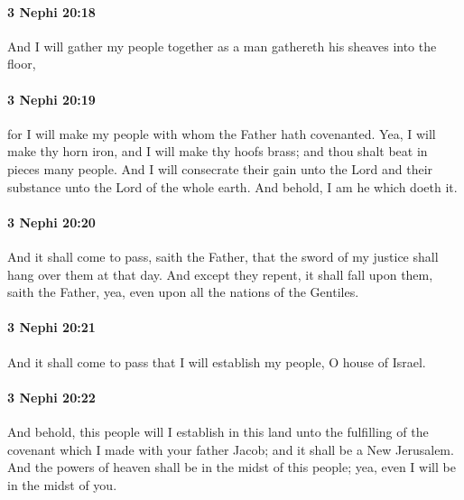 		\paragraph{3 Nephi 20:18} %
			\label{3NEPHI-20-18}

			And I will gather my people together
			as a man gathereth his sheaves into the floor,

		\paragraph{3 Nephi 20:19} %
			\label{3NEPHI-20-19}

			for I will make my people with whom the Father hath covenanted.
			Yea, I will make thy horn iron,
			and I will make thy hoofs brass;
			and thou shalt beat in pieces many people.
			And I will consecrate their gain unto the Lord
			and their substance unto the Lord of the whole earth.
			And behold, I am he which doeth it.

		\paragraph{3 Nephi 20:20} %
			\label{3NEPHI-20-20}

			And it shall come to pass, saith the Father,
			that the sword of my justice shall hang over them at that day.
			And except they repent, it shall fall upon them, saith the Father,
			yea, even upon all the nations of the Gentiles.

		\paragraph{3 Nephi 20:21} %
			\label{3NEPHI-20-21}

			And it shall come to pass that I will establish my people, O house of Israel.	

		\paragraph{3 Nephi 20:22} %
			\label{3NEPHI-20-22}

			And behold, this people will I establish in this land
			unto the fulfilling of the covenant which I made with your father Jacob;
			and it shall be a New Jerusalem.
			And the powers of heaven shall be in the midst of this people;
			yea, even I will be in the midst of you.

